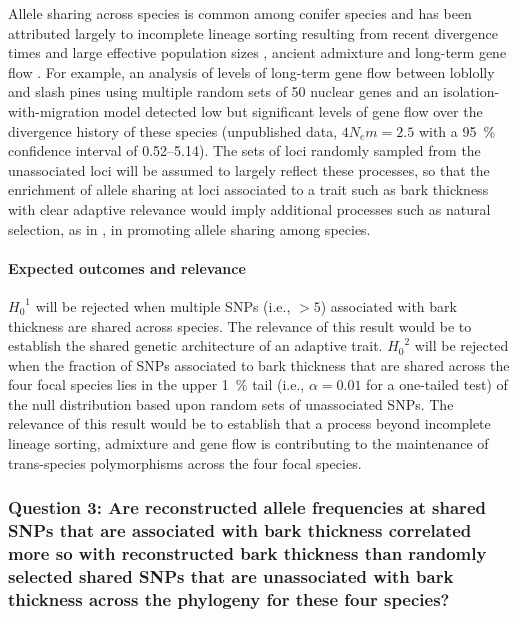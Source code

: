 Allele sharing across species is common among conifer species and has been attributed largely to incomplete lineage 
sorting resulting from recent divergence times and large effective population sizes \citep{Syring:2007gd,Willyard:2009ez}, 
ancient admixture \citep{Liston:2007cx} and 
long-term gene flow \citep{Zhou:2010hk}. For example, an analysis of 
levels of long-term gene flow between loblolly and slash pines using multiple random sets of 50 nuclear genes and an 
isolation-with-migration model \citep{Becquet:2007js} detected low but significant levels of gene flow over the divergence history 
of these species (unpublished data, $4 N_{e}m = 2.5$ with a \SI{95}{\percent} confidence interval of 0.52--5.14). The sets of loci 
randomly sampled from the unassociated loci will be assumed to largely reflect these processes, so that the 
enrichment of allele sharing at loci associated to a trait such as bark thickness with clear adaptive relevance 
\citep{He:2012bz} would imply additional processes such as natural selection, as in \cite{Segurel:vf}, in promoting allele 
sharing among species.

\paragraph{Expected outcomes and relevance} ${H_{0}}^1$ will be rejected when multiple SNPs (i.e., $> 5$) associated 
with bark thickness are shared across species. The relevance of this result would be to establish the shared genetic 
architecture of an adaptive trait. ${H_{0}}^2$ will be rejected when the fraction of SNPs associated to bark thickness that are 
shared across the four focal species lies in the upper \SI{1}{\percent} tail (i.e., $\alpha = 0.01$ for a one-tailed test) 
of the null distribution based upon random sets of unassociated SNPs. The relevance of this result would be to 
establish that a process beyond incomplete lineage sorting, admixture and gene flow is contributing to the 
maintenance of trans-species 
polymorphisms across the four focal species. 

\subsubsection*{Question 3: Are reconstructed allele frequencies at shared SNPs that are associated with bark thickness 
correlated more so with reconstructed bark thickness than randomly selected shared SNPs that are unassociated with bark 
thickness across the phylogeny for these four species?}

